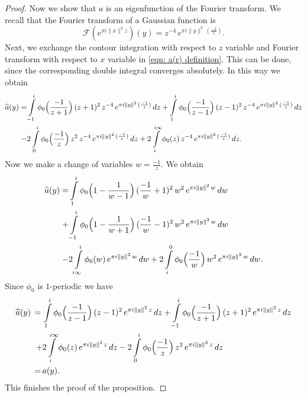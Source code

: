 \begin{proof}
  Now we show that $a$ is an eigenfunction of the Fourier transform. We recall that the Fourier transform of a Gaussian function is
  \begin{equation}\label{eqn: Gaussian Fourier}\mathcal{F}(e^{\pi i  \|x\|^2 z})(y)=z^{-4}\,e^{\pi i \|y\|^2 \,(\frac{-1}{z}) }.\end{equation}
  Next, we exchange the contour integration with respect to $z$ variable and Fourier transform  with respect to $x$ variable in \eqref{eqn: a(r) definition}. This can be done, since the corresponding double integral converges absolutely. In this way we obtain
  \begin{align}
    \widehat{a}(y)=&\int\limits_{-1}^i\phi_0\Big(\frac{-1}{z+1}\Big)\,(z+1)^2\,z^{-4}\,e^{\pi i \|y\|^2 \,(\frac{-1}{z})}\,dz
    +\int\limits_{1}^i\phi_0\Big(\frac{-1}{z-1}\Big)\,(z-1)^2\,z^{-4}\,e^{\pi i \|y\|^2 \,(\frac{-1}{z})}\,dz\notag \\
    -&2\int\limits_{0}^i\phi_0\Big(\frac{-1}{z}\Big)\,z^2\,z^{-4}\,e^{\pi i \|y\|^2 \,(\frac{-1}{z})}\,dz +2\int\limits_{i}^{i\infty}\phi_0(z)\,z^{-4}\,e^{\pi i \|y\|^2 \,(\frac{-1}{z})}\,dz.\notag
  \end{align}
  Now we make a change of variables $w=\frac{-1}{z}$. We obtain
  \begin{align}
    \widehat{a}(y)=&\int\limits_{1}^i\phi_0\Big(1-\frac{1}{w-1}\Big)\,(\frac{-1}{w}+1)^2\,w^{2}\,e^{\pi i \|y\|^2 \,w}\,dw\notag\\
    +&\int\limits_{-1}^i\phi_0\Big(1-\frac{1}{w+1}\Big)\,(\frac{-1}{w}-1)^2\,w^2\,e^{\pi i \|y\|^2 \,w}\,dw\\
    -&2\int\limits_{i \infty}^i\phi_0(w)\,e^{\pi i \|y\|^2 \,w}\,dw +2\int\limits_{i}^{0}\phi_0\Big(\frac{-1}{w}\Big)\,w^{2}\,e^{\pi i \|y\|^2 \,w}\,dw.\notag
  \end{align}
  Since $\phi_0$ is $1$-periodic we have
  \begin{align}
    \widehat{a}(y)\,=\,&\int\limits_{1}^i\phi_0\Big(\frac{-1}{z-1}\Big)\,(z-1)^2\,e^{\pi i \|y\|^2 \,z}\,dz
    +\int\limits_{-1}^i\phi_0\Big(\frac{-1}{z+1}\Big)\,(z+1)^2\,e^{\pi i \|y\|^2 \,z}\,dz\notag \\
    +&2\int\limits_{i}^{i\infty}\phi_0(z)\,e^{\pi i \|y\|^2 \,z}\,dz
    -2\int\limits_{0}^{i}\phi_0\Big(\frac{-1}{z}\Big)\,z^{2}\,e^{\pi i \|y\|^2 \,z}\,dz\notag \\
    \,=\,&a(y).
  \end{align}
  This finishes the proof of the proposition.
  \end{proof}

